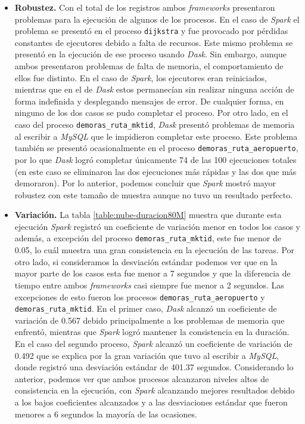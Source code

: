 \begin{itemize}
	\item \textbf{Robustez.} Con el total de los registros ambos \textit{frameworks} presentaron problemas para la ejecución de algunos de los procesos. En el caso de \textit{Spark} el problema se presentó en el proceso \texttt{dijkstra} y fue provocado por pérdidas constantes de ejecutores debido a falta de recursos. Este mismo problema se presentó en la ejecución de ese proceso usando \textit{Dask}. Sin embargo, aunque ambos presentaron problemas de falta de memoria, el comportamiento de ellos fue distinto. En el caso de \textit{Spark}, los ejecutores eran reiniciados, mientras que en el de \textit{Dask} estos permanecían sin realizar ninguna acción de forma indefinida y desplegando mensajes de error. De cualquier forma, en ninguno de los dos casos se pudo completar el proceso. Por otro lado, en el caso del proceso \texttt{demoras\_ruta\_mktid}, \textit{Dask} presentó problemas de memoria al escribir a \textit{MySQL} que le impidieron completar este proceso. Este problema también se presentó ocasionalmente en el proceso \texttt{demoras\_ruta\_aeropuerto}, por lo que \textit{Dask} logró completar únicamente 74 de las 100 ejecuciones totales (en este caso se eliminaron las dos ejecuciones más rápidas y las dos que más demoraron). Por lo anterior, podemos concluir que \textit{Spark} mostró mayor robustez con este tamaño de muestra aunque no tuvo un resultado perfecto. 
	
	\item \textbf{Variación.} La tabla \ref{table:nube-duracion80M} muestra que durante esta ejecución \textit{Spark} registró un coeficiente de variación menor en todos los casos y además, a excepción del proceso \texttt{demoras\_ruta\_mktid}, este fue menor de 0.05, lo cuál muestra una gran consistencia en la ejecución de las tareas. Por otro lado, si consideramos la desviación estándar podemos ver que en la mayor parte de los casos esta fue menor a 7 segundos y que la diferencia de tiempo entre ambos \textit{frameworks} casi siempre fue menor a 2 segundos. Las excepciones de esto fueron los procesos \texttt{demoras\_ruta\_aeropuerto} y \texttt{demoras\_ruta\_mktid}. En el primer caso, \textit{Dask} alcanzó un coeficiente de variación de 0.567 debido principalmente a los problemas de memoria que enfrentó, mientras que \textit{Spark} logró mantener la consistencia en la duración. En el caso del segundo proceso, \textit{Spark} alcanzó un coeficiente de variación de 0.492 que se explica por la gran variación que tuvo al escribir a \textit{MySQL}, donde registró una desviación estándar de 401.37 segundos. Considerando lo anterior, podemos ver que ambos procesos alcanzaron niveles altos de consistencia en la ejecución, con \textit{Spark} alcanzando mejores resultados debido a los bajos coeficientes alcanzados y a las desviaciones estándar que fueron menores a 6 segundos la mayoría de las ocasiones.
	

\end{itemize}
